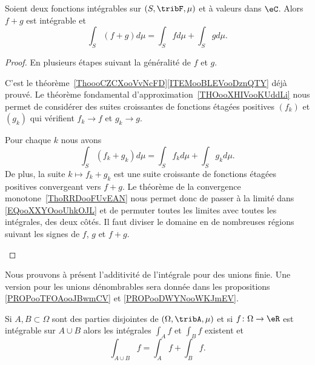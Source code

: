 \begin{proposition}     \label{PROPooFIYEooCpdmwZ}
	Soient deux fonctions intégrables sur \( (S,\tribF,\mu)\) et à valeurs dans \( \eC\). Alors \( f+g\) est intégrable et
	\begin{equation}
		\int_S(f+g)d\mu=\int_Sfd\mu+\int_Sgd\mu.
	\end{equation}
\end{proposition}

\begin{proof}
	En plusieurs étapes suivant la généralité de \( f\) et \( g\).
	\begin{subproof}
		C'est le théorème~\ref{ThoooCZCXooVvNcFD}\ref{ITEMooBLEVooDznQTY} déjà prouvé.
		Le théorème fondamental d'approximation~\ref{THOooXHIVooKUddLi} nous permet de considérer des suites croissantes de fonctions étagées positives \( (f_k)\) et \( (g_k)\) qui vérifient \( f_k\to f\) et \( g_k\to g\).

		Pour chaque \( k\) nous avons
		\begin{equation}        \label{EQooXXYOooUhkOJL}
			\int_S(f_k+g_k)d\mu=\int_Sf_kd\mu+\int_Sg_kd\mu.
		\end{equation}
		De plus, la suite \( k\mapsto f_k+g_k\) est une suite croissante de fonctions étagées positives convergeant vers \( f+g\). Le théorème de la convergence monotone~\ref{ThoRRDooFUvEAN} nous permet donc de passer à la limité dans \eqref{EQooXXYOooUhkOJL} et de permuter toutes les limites avec toutes les intégrales, des deux côtés.
		Il faut diviser le domaine en de nombreuses régions suivant les signes de \( f\), \( g\) et \( f+g\).
	\end{subproof}
\end{proof}

Nous prouvons à présent l'additivité de l'intégrale pour des unions finie. Une version pour les unions dénombrables sera donnée dans les propositions \ref{PROPooTFOAooJBwmCV} et \ref{PROPooDWYNooWKJmEV}.
\begin{proposition}     \label{PropOPSCooVpzaBt}
	Si \( A,B\subset \Omega\) sont des parties disjointes de \( (\Omega,\tribA,\mu)\) et si \( f\colon \Omega\to \eR\) est intégrable sur \( A\cup B\) alors les intégrales \( \int_Af\) et \( \int_Bf\) existent et
	\begin{equation}
		\int_{A\cup B}f=\int_Af+\int_Bf.
	\end{equation}
\end{proposition}

